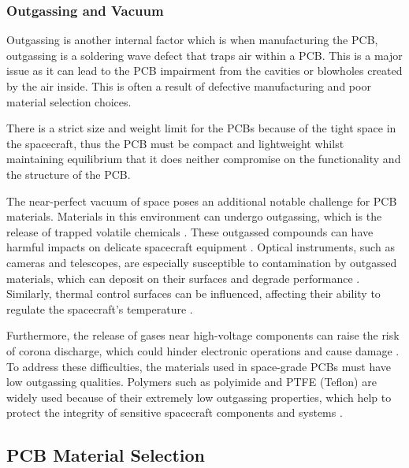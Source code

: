 \subsubsection{Outgassing and Vacuum}


Outgassing is another internal factor which is when manufacturing the PCB, 
outgassing is a soldering wave defect that traps air within a PCB. This is 
a major issue as it can lead to the PCB impairment from the cavities or 
blowholes created by the air inside. This is often a result of defective 
manufacturing and poor material selection choices.

There is a strict size and weight limit for the PCBs because of the tight 
space in the spacecraft, thus the PCB must be compact and lightweight whilst 
maintaining equilibrium that it does neither compromise on the functionality 
and the structure of the PCB.

The near-perfect vacuum of space poses an additional notable challenge for 
PCB materials. Materials in this environment can undergo outgassing, which 
is the release of trapped volatile chemicals \cite{RefWorks:2025applying}. 
These outgassed compounds can have harmful impacts on delicate spacecraft 
equipment \cite{RefWorks:2025pcbs}. Optical instruments, such as cameras and 
telescopes, are especially susceptible to contamination by outgassed materials, 
which can deposit on their surfaces and degrade performance \cite{RefWorks:proto-electronics2024space-grade}. 
Similarly, thermal control surfaces can be influenced, affecting their ability 
to regulate the spacecraft's temperature \cite{RefWorks:911eda2024space}.

Furthermore, the release of gases near high-voltage components can raise the 
risk of corona discharge, which could hinder electronic operations and cause 
damage \cite{RefWorks:911eda2024space}. To address these difficulties, the materials used 
in space-grade PCBs must have low outgassing qualities. Polymers such as 
polyimide and PTFE (Teflon) are widely used because of their extremely low 
outgassing properties, which help to protect the integrity of sensitive 
spacecraft components and systems \cite{RefWorks:proto-electronics2024space-grade}.

\subsection{PCB Material Selection}  %

